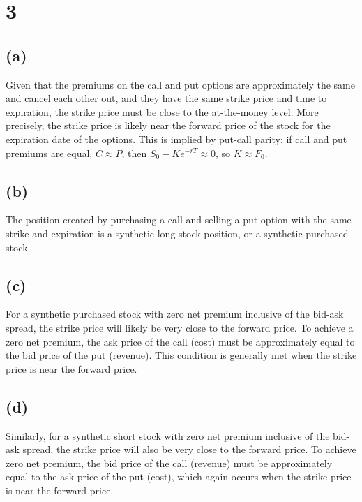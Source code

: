     \section{3}\label{section}

    \subsection{(a)}\label{a}

Given that the premiums on the call and put options are approximately
the same and cancel each other out, and they have the same strike price
and time to expiration, the strike price must be close to the
at-the-money level. More precisely, the strike price is likely near the
forward price of the stock for the expiration date of the options. This
is implied by put-call parity: if call and put premiums are equal,
\(C \approx P\), then \(S_0 - Ke^{-rT} \approx 0\), so
\(K \approx F_0\).

\subsection{(b)}\label{b}

The position created by purchasing a call and selling a put option with
the same strike and expiration is a synthetic long stock position, or a
synthetic purchased stock.

\subsection{(c)}\label{c}

For a synthetic purchased stock with zero net premium inclusive of the
bid-ask spread, the strike price will likely be very close to the
forward price. To achieve a zero net premium, the ask price of the call
(cost) must be approximately equal to the bid price of the put
(revenue). This condition is generally met when the strike price is near
the forward price.

\subsection{(d)}\label{d}

Similarly, for a synthetic short stock with zero net premium inclusive
of the bid-ask spread, the strike price will also be very close to the
forward price. To achieve zero net premium, the bid price of the call
(revenue) must be approximately equal to the ask price of the put
(cost), which again occurs when the strike price is near the forward
price.

